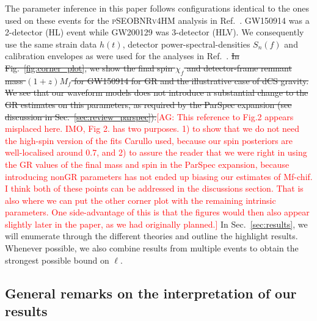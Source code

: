 \documentclass[twocolumn,
               prd,
               aps,
               superscriptaddress,
               tightenlines,
               nofootinbib,
               eqsecnum,
               amsfonts,
               amsmath,
               longbibliography]{revtex4-1}
\newcommand{\agcomm}[1]{{\textcolor{red}{{[AG: #1]}} }}
\newcommand{\hs}[1]{{\textcolor{blue}{{[HS: #1]}} }}
\begin{document}
The parameter inference in this paper follows configurations identical to the
ones used on these events for the \textsc{pSEOBNRv4HM} analysis in
Ref.~\cite{LIGOScientific:2021sio}. GW150914 was a 2-detector  (HL) event while
GW200129 was 3-detector (HLV).
%
We consequently use the same strain data $h(t)$, detector
power-spectral-densities $S_n(f)$ and calibration envelopes as were used for
the analyses in Ref.~\cite{LIGOScientific:2021sio}.
%
%
\sout{In Fig.~\ref{fig:corner_plot}, we show the final spin $\chi_f$ and
detector-frame remnant mass $(1 + z) M_f$ for GW150914 for GR and the
illustrative case of dCS gravity. We see that our waveform models does not
introduce a substantial change to the GR estimates on this parameters, as
required by the ParSpec expansion (see discussion in
Sec.~\ref{sec:review_parspec}).}\agcomm{This reference to Fig.2 appears misplaced here. IMO, Fig 2. has two purposes. 1) to show that we do not need the high-spin version of the fits Carullo used, because our spin posteriors are well-localised around 0.7, and 2) to assure the reader that we were right in using the GR values of the final mass and spin in the ParSpec expansion, because introducing nonGR parameters has not ended up biasing our estimates of Mf-chif.  I think both of these points can be addressed in the discussions section. That is also where we can put the other corner plot with the remaining intrinsic parameters. One side-advantage of this is that the figures would then also appear slightly later in the paper, as we had originally planned.}
%
In Sec.~\ref{sec:results}, we will enumerate through the different theories and
outline the highlight results. Whenever possible, we also combine results from
multiple events to obtain the strongest possible bound on $\ell$.



\subsection{General remarks on the interpretation of our results}
\label{sec:remarks}
\end{document}
